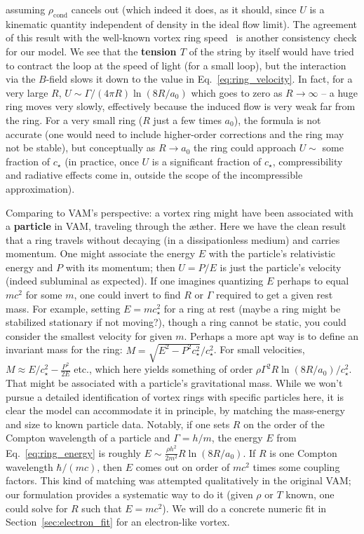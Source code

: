 \documentclass[12pt]{article}
\begin{document}
assuming $\rho_{\text{cond}}$ cancels out (which indeed it does, as it should, since $U$ is a kinematic quantity independent of density in the ideal flow limit). The agreement of this result with the well-known vortex ring speed~\cite{ref:saffman} is another consistency check for our model. We see that the \textbf{tension $T$} of the string by itself would have tried to contract the loop at the speed of light (for a small loop), but the interaction via the $B$-field slows it down to the value in Eq.~\eqref{eq:ring_velocity}. In fact, for a very large $R$, $U \sim \Gamma/(4\pi R)\ln(8R/a_0)$ which goes to zero as $R\to \infty$ -- a huge ring moves very slowly, effectively because the induced flow is very weak far from the ring. For a very small ring ($R$ just a few times $a_0$), the formula is not accurate (one would need to include higher-order corrections and the ring may not be stable), but conceptually as $R \to a_0$ the ring could approach $U \sim$ some fraction of $c_\star$ (in practice, once $U$ is a significant fraction of $c_\star$, compressibility and radiative effects come in, outside the scope of the incompressible approximation).

Comparing to VAM’s perspective: a vortex ring might have been associated with a \textbf{particle} in VAM, traveling through the æther. Here we have the clean result that a ring travels without decaying (in a dissipationless medium) and carries momentum. One might associate the energy $E$ with the particle’s relativistic energy and $P$ with its momentum; then $U = P/E$ is just the particle’s velocity (indeed subluminal as expected). If one imagines quantizing $E$ perhaps to equal $mc^2$ for some $m$, one could invert to find $R$ or $\Gamma$ required to get a given rest mass. For example, setting $E = m c_\star^2$ for a ring at rest (maybe a ring might be stabilized stationary if not moving?), though a ring cannot be static, you could consider the smallest velocity for given $m$. Perhaps a more apt way is to define an invariant mass for the ring: $M = \sqrt{E^2 - P^2 c_\star^2}/c_\star^2$. For small velocities, $M \approx E/c_\star^2 - \frac{P^2}{2E}$ etc., which here yields something of order $\rho \Gamma^2 R \ln(8R/a_0)/c_\star^2$. That might be associated with a particle’s gravitational mass. While we won’t pursue a detailed identification of vortex rings with specific particles here, it is clear the model can accommodate it in principle, by matching the mass-energy and size to known particle data. Notably, if one sets $R$ on the order of the Compton wavelength of a particle and $\Gamma = h/m$, the energy $E$ from Eq.~\eqref{eq:ring_energy} is roughly $E \sim \frac{\rho h^2}{2m^2} R \ln(8R/a_0)$. If $R$ is one Compton wavelength $\hbar/(mc)$, then $E$ comes out on order of $mc^2$ times some coupling factors. This kind of matching was attempted qualitatively in the original VAM; our formulation provides a systematic way to do it (given $\rho$ or $T$ known, one could solve for $R$ such that $E = m c^2$). We will do a concrete numeric fit in Section~\ref{sec:electron_fit} for an electron-like vortex.
\end{document}
